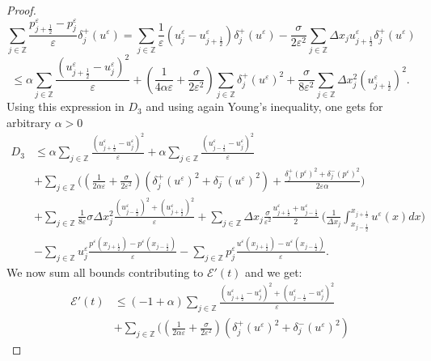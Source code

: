 \documentclass[a4paper,french,english,10pt]{article}
\newcommand\eps{\varepsilon}
\begin{document}
\begin{proof}
$$
\underset{j\in \mathbb{Z}}{\sum}
\frac{p_{j+\frac12 }^{\eps}-p_{j}^{\eps}}{\eps}
\delta_{j }^+\left( u^{\eps}\right) 
= \sum_{j\in \mathbb{Z}} \frac{1}{\eps} (
u^{\eps}_j-u_{j+\frac12 }^{\eps})\delta_{j }^+\left( u^{\eps}\right) 
 -\frac{\sigma}{2\eps^2}
\sum_{j\in \mathbb{Z}}\Delta x_j 
u_{j+\frac12 }^{\eps}
\delta_{j }^+\left( u^{\eps}\right) 
$$
$$
\leq \alpha \sum_{j\in \mathbb{Z}}
\frac{(u_{j+\frac12 }^{\eps}-u_j^{\eps})^2}{\eps}
+
\left( \frac{1}{4\alpha\eps}+
\frac{\sigma}{2\eps^2}
\right)
\sum_{j\in \mathbb{Z}}
\delta_{j}^+\left(u^{\eps}\right)^2+
\frac\sigma{8\eps^2}
\sum_{j\in \mathbb{Z}}
\Delta x_j^2 \left( u_{j+\frac12 }^{\eps}\right)^2.
$$
Using this expression in $D_3$ and  using again Young's inequality, one gets for 
arbitrary  $\alpha>0$
\begin{equation*}
\begin{aligned}
 D_3 &\leq \alpha \sum_{j\in \mathbb{Z}}
\frac{(u_{j+\frac12 }^{\eps}-u_j^{\eps})^2}{\eps} + \alpha \sum_{j\in
\mathbb{Z}} \frac{(u_{j-\frac12 }^{\eps}-u_j^{\eps})^2}{\eps} \\
&+\sum_{j\in \mathbb{Z}} \bigg(
\left( \frac{1}{2\alpha\eps}+\frac{\sigma}{2\eps^2}\right)
\left( 
\delta_{j}^+\left(u^{\eps}\right)^2+
\delta_{j}^-\left(u^{\eps}\right)^2
\right)
+\frac{\delta_{j}^+\left(p^{\eps}\right)^2
+\delta_{j}^-\left(p^{\eps}\right)^2
}{2\eps\alpha} \bigg) \\
&+ \sum_{j\in \mathbb{Z}} \frac{1}{8\eps} \sigma \Delta x_j^2
\frac{(u_{j-\frac12 }^{\eps})^2 + (u_{j+\frac12 }^{\eps})^2}{\eps}+
\sum_{j\in \mathbb{Z}} \Delta x_j  \frac{\sigma}{\eps^2}
\frac{u_{j+\frac12 }^{\eps}+u_{j-\frac12 }^{\eps}}{2}\: \bigg(
\frac{1}{\Delta x_j} {\int_{x_{j-\frac12}}^{x_{j+\frac12}}}u^{\eps}(x) dx \bigg) \\
&- \sum_{j\in \mathbb{Z}} u^{\eps}_j 
\frac{p^{\eps}(x_{j+\frac12 })-p^{\eps}(x_{j-\frac12 })}{\eps} -
\sum_{j\in \mathbb{Z}} p^{\eps}_j
\frac{u^{\eps}(x_{j+\frac12 })-u^{\eps}(x_{j-\frac12 })}{\eps}.
\end{aligned}
\end{equation*}
We now sum  all  bounds contributing to $\mathscr{E}'(t)$ and we get:
\begin{equation*}
\begin{aligned}
\mathscr{E}'(t)  & \leq (-1+\alpha) \sum_{j\in \mathbb{Z}}
\frac{(u_{j+\frac12 }^{\eps}-u_j^{\eps})^2+(u_{j-\frac12 }^{\eps}-u_j^{
\eps})^2}{\eps} \\
&+\sum_{j\in \mathbb{Z}} \bigg(
\left( \frac{1}{2\alpha\eps}+\frac{\sigma}{2\eps^2}\right)
\left ( \delta_{j}^+(u^{\eps})^2+\delta_{j}^-(u^{\eps})^2\right )

\end{aligned}
\end{equation*}
\end{proof}
\end{document}
